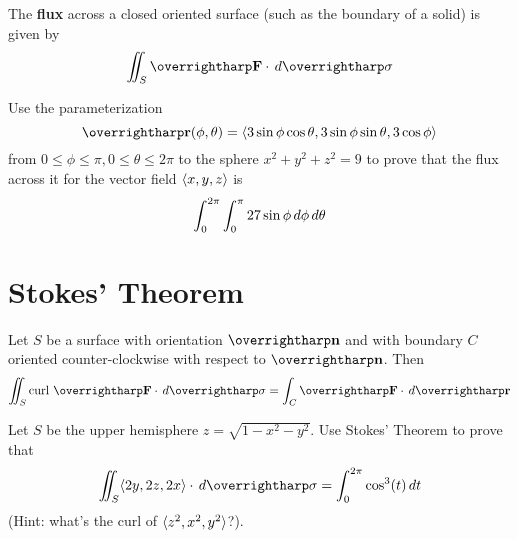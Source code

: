 \documentclass[letterpaper, twoside, 12pt]{book}
\begin{document}
\begin{definition}
  The \textbf{flux} across a closed oriented surface (such as
  the boundary of a solid) is given by
  \[
    \iint_S \vect{F}\cdot\dvar{\vect\sigma}
  \]
\end{definition}

          \begin{problem}
            Use the parameterization
            \[
              \vect{r}(\phi,\theta)
                =
              \<
                3\sin\phi\cos\theta,
                3\sin\phi\sin\theta,
                3\cos\phi
              \>
            \]
            from $0\leq\phi\leq\pi,0\leq\theta\leq2\pi$ to the sphere
            $x^2+y^2+z^2=9$ to prove that the flux across it for the
            vector field $\langle x,y,z\rangle$ is
            \[
              \int_0^{2\pi}\int_0^\pi 27\sin\phi \,d{\phi}\,d{\theta}
            \]
          \end{problem}

          \begin{solution}

          \end{solution}

          \begin{contributors}

          \end{contributors}


\section{Stokes' Theorem}%

\begin{theorem}
  Let $S$ be a surface with orientation $\vect{n}$
  and with boundary $C$ oriented counter-clockwise with respect to $\vect{n}$.
  Then
  \[
    \iint_S \text{curl }\vect{F}\cdot\dvar{\vect\sigma}
      =
    \int_C \vect{F}\cdot\dvar{\vect{r}}
  \]
\end{theorem}

          \begin{problem}
            Let $S$ be the upper hemisphere $z=\sqrt{1-x^2-y^2}$. Use
            Stokes' Theorem to prove that
            \[
              \iint_S \<2y,2z,2x\>\cdot\dvar{\vect\sigma}
                =
              \int_0^{2\pi} \cos^3(t) \dvar{t}
            \]
            (Hint: what's the curl of $\langle z^2,x^2,y^2\rangle$?).
          \end{problem}

          \begin{solution}

          \end{solution}
\end{document}
